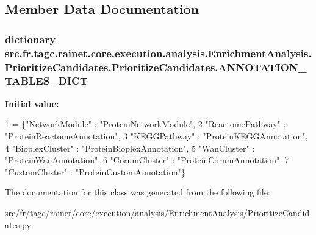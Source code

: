 \subsection{Member Data Documentation}
\hypertarget{classsrc_1_1fr_1_1tagc_1_1rainet_1_1core_1_1execution_1_1analysis_1_1EnrichmentAnalysis_1_1Prior94c714899de0f856e07a4365752425c2_a8415ecd33ec1a93a4edfdee553b85f95}{
\subsubsection[{A\-N\-N\-O\-T\-A\-T\-I\-O\-N\-\_\-\-T\-A\-B\-L\-E\-S\-\_\-\-D\-I\-C\-T}]{\setlength{\rightskip}{0pt plus 5cm}dictionary src.\-fr.\-tagc.\-rainet.\-core.\-execution.\-analysis.\-Enrichment\-Analysis.\-Prioritize\-Candidates.\-Prioritize\-Candidates.\-A\-N\-N\-O\-T\-A\-T\-I\-O\-N\-\_\-\-T\-A\-B\-L\-E\-S\-\_\-\-D\-I\-C\-T\hspace{0.3cm}{\ttfamily [static]}}}\label{classsrc_1_1fr_1_1tagc_1_1rainet_1_1core_1_1execution_1_1analysis_1_1EnrichmentAnalysis_1_1Prior94c714899de0f856e07a4365752425c2_a8415ecd33ec1a93a4edfdee553b85f95}
{\bfseries Initial value\-:}
\begin{DoxyCode}
1 = \{\textcolor{stringliteral}{"NetworkModule"} : \textcolor{stringliteral}{"ProteinNetworkModule"},
2                               \textcolor{stringliteral}{"ReactomePathway"} : \textcolor{stringliteral}{"ProteinReactomeAnnotation"},
3                               \textcolor{stringliteral}{"KEGGPathway"} : \textcolor{stringliteral}{"ProteinKEGGAnnotation"},
4                               \textcolor{stringliteral}{"BioplexCluster"} : \textcolor{stringliteral}{"ProteinBioplexAnnotation"},
5                               \textcolor{stringliteral}{"WanCluster"} : \textcolor{stringliteral}{"ProteinWanAnnotation"},
6                               \textcolor{stringliteral}{"CorumCluster"} : \textcolor{stringliteral}{"ProteinCorumAnnotation"},
7                               \textcolor{stringliteral}{"CustomCluster"} : \textcolor{stringliteral}{"ProteinCustomAnnotation"}\}
\end{DoxyCode}


The documentation for this class was generated from the following file\-:\begin{DoxyCompactItemize}
\item 
src/fr/tagc/rainet/core/execution/analysis/\-Enrichment\-Analysis/Prioritize\-Candidates.\-py\end{DoxyCompactItemize}
